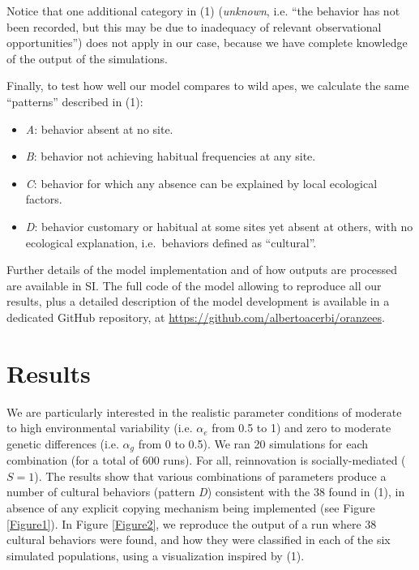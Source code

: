 \documentclass[9pt,twocolumn,twoside,]{pnas-new}
\begin{document}
Notice that one additional category in (1) (\emph{unknown}, i.e. ``the
behavior has not been recorded, but this may be due to inadequacy of
relevant observational opportunities'') does not apply in our case,
because we have complete knowledge of the output of the simulations.

Finally, to test how well our model compares to wild apes, we calculate
the same ``patterns'' described in (1):

\begin{itemize}
\item
  \emph{A}: behavior absent at no site.
\item
  \emph{B}: behavior not achieving habitual frequencies at any site.
\item
  \emph{C}: behavior for which any absence can be explained by local
  ecological factors.
\item
  \emph{D}: behavior customary or habitual at some sites yet absent at
  others, with no ecological explanation, i.e.~behaviors defined as
  ``cultural''.
\end{itemize}

Further details of the model implementation and of how outputs are
processed are available in SI. The full code of the model allowing to
reproduce all our results, plus a detailed description of the model
development is available in a dedicated GitHub repository, at
\url{https://github.com/albertoacerbi/oranzees}.

\section*{Results}\label{results}

We are particularly interested in the realistic parameter conditions of
moderate to high environmental variability (i.e. \(\alpha_e\) from 0.5
to 1) and zero to moderate genetic differences (i.e. \(\alpha_g\) from 0
to 0.5). We ran 20 simulations for each combination (for a total of 600
runs). For all, reinnovation is socially-mediated (\(S=1\)). The results
show that various combinations of parameters produce a number of
cultural behaviors (pattern \emph{D}) consistent with the 38 found in
(1), in absence of any explicit copying mechanism being implemented (see
Figure \ref{Figure1}). In Figure \ref{Figure2}, we reproduce the output
of a run where 38 cultural behaviors were found, and how they were
classified in each of the six simulated populations, using a
visualization inspired by (1).
\end{document}
